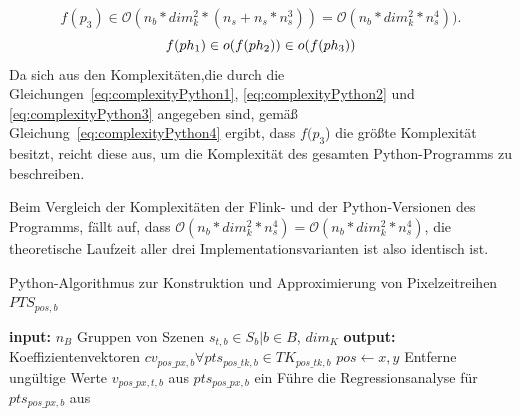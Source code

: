 %
\begin{equation} \label{eq:complexityPython3}
f(p_3) \in \mathcal{O}(n_b * dim_k^2 * (n_s + n_s * n_s^3)) = \mathcal{O}(n_b * dim_k^2 * n_s^4)).
\end{equation}
%
\begin{equation} \label{eq:complexityPython4}
f(ph_1) \in \mathnormal{o}(f(ph_2)) \in \mathnormal{o}(f(ph_3))
\end{equation}
%
Da sich aus den Komplexitäten,die durch die Gleichungen~\ref{eq:complexityPython1}, \ref{eq:complexityPython2} und \ref{eq:complexityPython3} angegeben sind, gemäß Gleichung~\ref{eq:complexityPython4} ergibt, dass $f(p_3$) die größte Komplexität besitzt, reicht diese aus, um die Komplexität des gesamten Python-Programms zu beschreiben.

Beim Vergleich der Komplexitäten der Flink- und der Python-Versionen des Programms, fällt auf, dass  $\mathcal{O}(n_b * dim_k^2 * n_s^4) = \mathcal{O}(n_b * dim_k^2 * n_s^4)$, die theoretische Laufzeit aller drei Implementationsvarianten ist also identisch ist.

\begin{algorithm}[H]
\small
\caption{Python-Algorithmus zur Konstruktion und Approximierung von Pixelzeitreihen $PTS_{pos, b}$}
\label{alg:python}
\begin{algorithmic}[1]
	\State \textbf{input:} $n_B$ Gruppen von Szenen $s_{t, b} \in S_{b} | b \in B$, $dim_K$
	\State \textbf{output:} Koeffizientenvektoren $cv_{pos\_px, b} \forall pts_{pos\_tk, b} \in TK_{pos\_tk, b}$
	  \label{alg:iterB}
        		  \label{alg:iterX}
			  \label{alg:iterY}
				\State $pos \leftarrow x, y$  
				  \label{alg:iterPTS}
					\State Entferne ungültige Werte $v_{pos\_px, t, b}$ aus $pts_{pos\_px, b}$ ein  
				\EndFor
				\State Führe die Regressionsanalyse für $pts_{pos\_px, b}$ aus  \label{alg:regression}
			\EndFor
		\EndFor
	\EndFor
		
		 
	\EndFunction
\end{algorithmic}
\end{algorithm}

